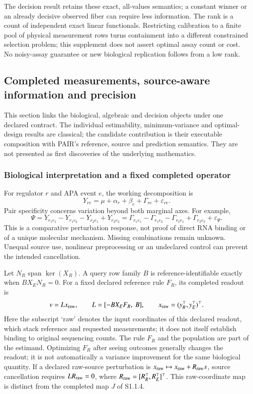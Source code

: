 \documentclass[11pt]{article}
\begin{document}
The decision result retains these exact, all-values semantics; a constant winner or an already decisive observed fiber can require less information. The rank is a count of independent exact linear functionals. Restricting calibration to a finite pool of physical measurement rows turns containment into a different constrained selection problem; this supplement does not assert optimal assay count or cost. No noisy-assay guarantee or new biological replication follows from a low rank.


\subsection{Completed measurements, source-aware information and precision}
\label{sec:claiminformation}
This section links the biological, algebraic and decision objects under one declared contract. The individual estimability, minimum-variance and optimal-design results are classical; the candidate contribution is their executable composition with PAIR's reference, source and prediction semantics. They are not presented as first discoveries of the underlying mathematics.

\subsubsection{Biological interpretation and a fixed completed operator}
For regulator $r$ and APA event $e$, the working decomposition is
\[
Y_{re}=\mu+\alpha_r+\beta_e+\Gamma_{re}+\varepsilon_{re}.
\]
Pair specificity concerns variation beyond both marginal axes. For example,
\[
\Psi=Y_{r_1e_1}-Y_{r_1e_2}-Y_{r_2e_1}+Y_{r_2e_2}
=\Gamma_{r_1e_1}-\Gamma_{r_1e_2}-\Gamma_{r_2e_1}+\Gamma_{r_2e_2}+\varepsilon_\Psi.
\]
This is a comparative perturbation response, not proof of direct RNA binding or of a unique molecular mechanism. Missing combinations remain unknown. Unequal source use, nonlinear preprocessing or an undeclared control can prevent the intended cancellation.

Let $N_R$ span $\ker(X_R)$. A query row family $B$ is reference-identifiable exactly when $BX_EN_R=0$. For a fixed declared reference rule $F_R$, its completed readout is
\[
v=Lx_{\rm raw},\qquad L=[-BX_EF_R,\ B],\qquad x_{\rm raw}=(y_R^\top,y_E^\top)^\top.
\]
Here the subscript `raw' denotes the input coordinates of this declared readout, which stack reference and requested measurements; it does not itself establish binding to original sequencing counts. The rule $F_R$ and the population are part of the estimand. Optimizing $F_R$ after seeing outcomes generally changes the readout; it is not automatically a variance improvement for the same biological quantity. If a declared raw-source perturbation is $x_{\rm raw}\mapsto x_{\rm raw}+R_{\rm raw}s$, source cancellation requires $LR_{\rm raw}=0$, where $R_{\rm raw}=[R_R^\top,R_E^\top]^\top$. This raw-coordinate map is distinct from the completed map $J$ of S1.1.4.
\end{document}
